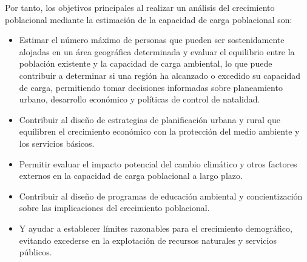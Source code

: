 \documentclass[a4paper,10pt,twocolumn]{article}
\begin{document}
Por tanto, los objetivos principales al realizar un análisis del crecimiento poblacional mediante la estimación de la capacidad de carga poblacional son: 
\begin{itemize}
	\item Estimar el número máximo de personas que pueden ser sostenidamente alojadas en un área geográfica determinada y evaluar el equilibrio entre la población existente y la capacidad de carga ambiental, lo que puede contribuir a determinar si una región ha alcanzado o excedido su capacidad de carga, permitiendo tomar decisiones informadas sobre planeamiento urbano, desarrollo económico y políticas de control de natalidad. 
	\item Contribuir al diseño de estrategias de planificación urbana y rural que equilibren el crecimiento económico con la protección del medio ambiente y los servicios básicos. 
	\item Permitir evaluar el impacto potencial del cambio climático y otros factores externos en la capacidad de carga poblacional a largo plazo. 
	\item Contribuir al diseño de programas de educación ambiental y concientización sobre las implicaciones del crecimiento poblacional.
	\item Y ayudar a establecer límites razonables para el crecimiento demográfico, evitando excederse en la explotación de recursos naturales y servicios públicos. 
\end{itemize}




\end{document}

